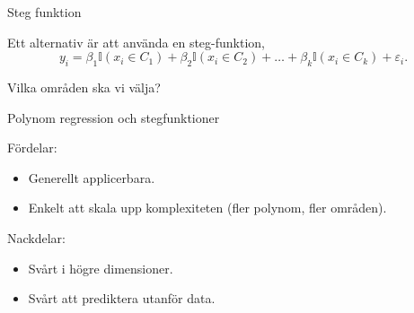 \documentclass[10pt,english]{beamer}
\begin{document}



\begin{frame}{Steg funktion}

    Ett alternativ är att använda en steg-funktion,
    \begin{equation*}
        y_i = \beta_1 \mathbb{I}(x_i \in C_1) + \beta_2 \mathbb{I}(x_i \in C_2) + \ldots + \beta_k \mathbb{I}(x_i \in C_k) + \varepsilon_i.
    \end{equation*}
    
    Vilka områden ska vi välja?


\end{frame}

\begin{frame}{Polynom regression och stegfunktioner}
    
    Fördelar:
    \begin{itemize}
        \item Generellt applicerbara.
        \item Enkelt att skala upp komplexiteten (fler polynom, fler områden).
    \end{itemize}

    Nackdelar:
    \begin{itemize}
        \item Svårt i högre dimensioner.
        \item Svårt att prediktera utanför data.
    \end{itemize}
\end{frame}
\end{document}

